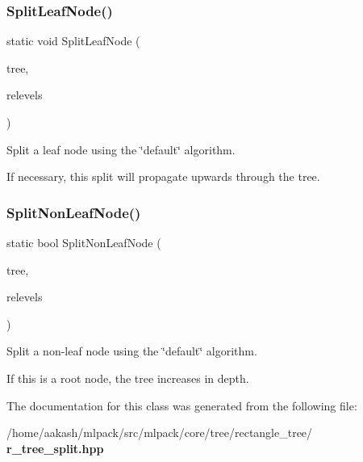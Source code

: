 \subsubsection{Split\+Leaf\+Node()}
{\footnotesize\ttfamily static void Split\+Leaf\+Node (\begin{DoxyParamCaption}\item[{Tree\+Type $\ast$}]{tree,  }\item[{std\+::vector$<$ bool $>$ \&}]{relevels }\end{DoxyParamCaption})\hspace{0.3cm}{\ttfamily [static]}}



Split a leaf node using the \char`\"{}default\char`\"{} algorithm. 

If necessary, this split will propagate upwards through the tree. \mbox{\label{classmlpack_1_1tree_1_1RTreeSplit_a73ff1eaa94449d763847fff1f537922f}} 
\subsubsection{Split\+Non\+Leaf\+Node()}
{\footnotesize\ttfamily static bool Split\+Non\+Leaf\+Node (\begin{DoxyParamCaption}\item[{Tree\+Type $\ast$}]{tree,  }\item[{std\+::vector$<$ bool $>$ \&}]{relevels }\end{DoxyParamCaption})\hspace{0.3cm}{\ttfamily [static]}}



Split a non-\/leaf node using the \char`\"{}default\char`\"{} algorithm. 

If this is a root node, the tree increases in depth. 

The documentation for this class was generated from the following file\+:\begin{DoxyCompactItemize}
\item 
/home/aakash/mlpack/src/mlpack/core/tree/rectangle\+\_\+tree/\textbf{ r\+\_\+tree\+\_\+split.\+hpp}\end{DoxyCompactItemize}
